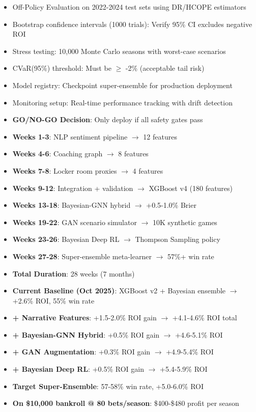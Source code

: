 \begin{itemize}
  \item {} Off-Policy Evaluation on 2022-2024 test sets using DR/HCOPE estimators
  \item {} Bootstrap confidence intervals (1000 trials): Verify 95\% CI excludes negative ROI
  \item {} Stress testing: 10,000 Monte Carlo seasons with worst-case scenarios
  \item {} CVaR(95\%) threshold: Must be $\ge$ -2\% (acceptable tail risk)
  \item {} Model registry: Checkpoint super-ensemble for production deployment
  \item {} Monitoring setup: Real-time performance tracking with drift detection
  \item \textbf{GO/NO-GO Decision}: Only deploy if all safety gates pass
\end{itemize}

\begin{itemize}
  \item \textbf{Weeks 1-3}: NLP sentiment pipeline $\to$ 12 features
  \item \textbf{Weeks 4-6}: Coaching graph $\to$ 8 features
  \item \textbf{Weeks 7-8}: Locker room proxies $\to$ 4 features
  \item \textbf{Weeks 9-12}: Integration + validation $\to$ XGBoost v4 (180 features)
  \item \textbf{Weeks 13-18}: Bayesian-GNN hybrid $\to$ +0.5-1.0\% Brier
  \item \textbf{Weeks 19-22}: GAN scenario simulator $\to$ 10K synthetic games
  \item \textbf{Weeks 23-26}: Bayesian Deep RL $\to$ Thompson Sampling policy
  \item \textbf{Weeks 27-28}: Super-ensemble meta-learner $\to$ 57\%+ win rate
  \item \textbf{Total Duration}: 28 weeks (7 months)
\end{itemize}

\begin{itemize}
  \item \textbf{Current Baseline (Oct 2025)}: XGBoost v2 + Bayesian ensemble $\to$ +2.6\% ROI, 55\% win rate
  \item \textbf{+ Narrative Features}: +1.5-2.0\% ROI gain $\to$ +4.1-4.6\% ROI total
  \item \textbf{+ Bayesian-GNN Hybrid}: +0.5\% ROI gain $\to$ +4.6-5.1\% ROI
  \item \textbf{+ GAN Augmentation}: +0.3\% ROI gain $\to$ +4.9-5.4\% ROI
  \item \textbf{+ Bayesian Deep RL}: +0.5\% ROI gain $\to$ +5.4-5.9\% ROI
  \item \textbf{Target Super-Ensemble}: 57-58\% win rate, +5.0-6.0\% ROI
  \item \textbf{On \$10,000 bankroll @ 80 bets/season}: \$400-\$480 profit per season
\end{itemize}

\endgroup
